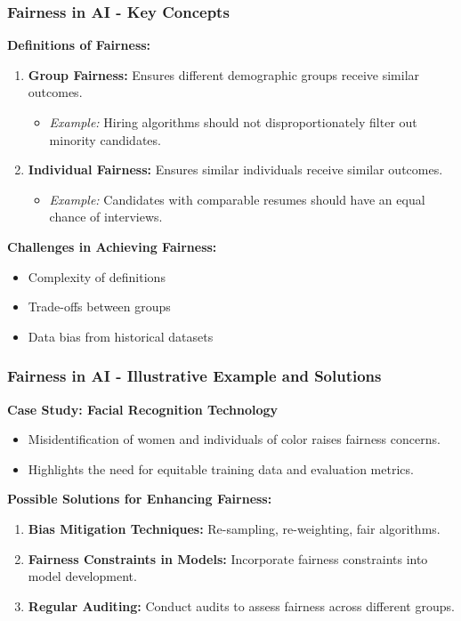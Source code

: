 \documentclass{beamer}
\begin{document}
\begin{frame}[fragile]
    \frametitle{Fairness in AI - Key Concepts}
    \textbf{Definitions of Fairness:}
    \begin{enumerate}
        \item \textbf{Group Fairness:} Ensures different demographic groups receive similar outcomes.
            \begin{itemize}
                \item \textit{Example:} Hiring algorithms should not disproportionately filter out minority candidates.
            \end{itemize}
        \item \textbf{Individual Fairness:} Ensures similar individuals receive similar outcomes.
            \begin{itemize}
                \item \textit{Example:} Candidates with comparable resumes should have an equal chance of interviews.
            \end{itemize}
    \end{enumerate}
    
    \textbf{Challenges in Achieving Fairness:}
    \begin{itemize}
        \item Complexity of definitions
        \item Trade-offs between groups
        \item Data bias from historical datasets
    \end{itemize}
\end{frame}

\begin{frame}[fragile]
    \frametitle{Fairness in AI - Illustrative Example and Solutions}
    \textbf{Case Study: Facial Recognition Technology}
    \begin{itemize}
        \item Misidentification of women and individuals of color raises fairness concerns.
        \item Highlights the need for equitable training data and evaluation metrics.
    \end{itemize}

    \textbf{Possible Solutions for Enhancing Fairness:}
    \begin{enumerate}
        \item \textbf{Bias Mitigation Techniques:} Re-sampling, re-weighting, fair algorithms.
        \item \textbf{Fairness Constraints in Models:} Incorporate fairness constraints into model development.
        \item \textbf{Regular Auditing:} Conduct audits to assess fairness across different groups.
    \end{enumerate}
\end{frame}
\end{document}
